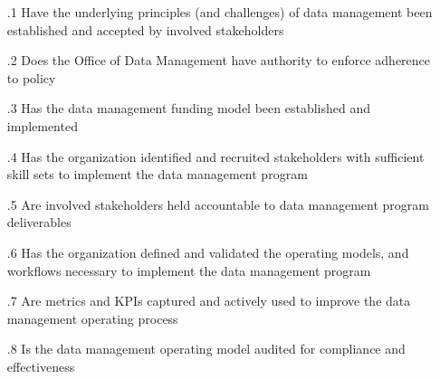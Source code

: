\begin{itemize}[leftmargin=.5in]

  \item [\thesection.1] Have the underlying principles (and challenges) of data management been established and accepted by involved stakeholders
  \item [\thesection.2] Does the Office of Data Management have authority to enforce adherence to policy
  \item [\thesection.3] Has the data management funding model been established and implemented
  \item [\thesection.4] Has the organization identified and recruited stakeholders with sufficient skill sets to implement the data management program
  \item [\thesection.5] Are involved stakeholders held accountable to data management program deliverables
  \item [\thesection.6] Has the organization defined and validated the operating models, and workflows necessary to implement the data management program
  \item [\thesection.7] Are metrics and KPIs captured and actively used to improve the data management operating process
  \item [\thesection.8] Is the data management operating model audited for compliance and effectiveness

\end{itemize}

